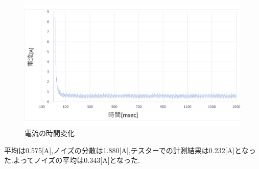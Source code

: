 \begin{figure}[htbp]
 \begin{center}
    \includegraphics[width=150mm]{img/currentMeasurement.png}
    \end{center}
  \caption{電流の時間変化}
 \label{fig:currentMeasurement}
\end{figure}

平均は0.575[A],ノイズの分散は1.880[A],テスターでの計測結果は0.232[A]となった.よってノイズの平均は0.343[A]となった.
